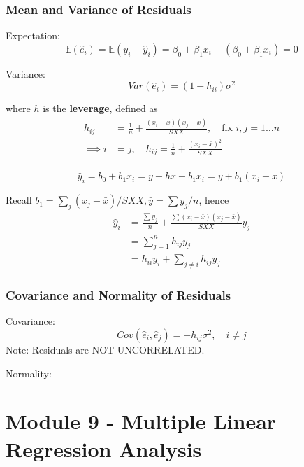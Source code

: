 \documentclass[11pt]{article}
\theoremstyle{definition}
\numberwithin{equation}{section}
\begin{document}
\subsubsection{Mean and Variance of Residuals}

Expectation:
\begin{equation}
  \mathbb{E}(\hat{e}_i)=\mathbb{E}(y_i - \hat{y}_i) = \beta_0+\beta_1x_i-(\beta_0+\beta_1x_i)=0
\end{equation}

Variance:
\begin{equation}
  Var(\hat{e}_i) = (1-h_{ii})\sigma^2
\end{equation}

where $h$ is the \textbf{leverage}, defined as 
\begin{align}
  h_{ij} &= \frac{1}{n} + \frac{(x_i-\bar{x})(x_j-\bar{x})}{SXX},\quad\text{fix }i,j=1\dots n\\
  \implies i&=j,\quad h_{ij} =\frac{1}{n}+\frac{(x_i-\bar{x})^2}{SXX}\\
\end{align}

\begin{equation}
  \hat{y}_i=b_0+b_1x_i=\bar{y}-h\bar{x}+b_1x_i=\bar{y}+b_1(x_i-\bar{x})
\end{equation}

Recall $b_1=\sum_j(x_j-\bar{x})/SXX,\bar{y}=\sum y_j/n$, hence
\begin{align}
  \hat{y}_i&=\frac{\sum y_j}{n} + \frac{\sum(x_i-\bar{x})(x_j-\bar{x})}{SXX}y_j\\
  &= \sum^n_{j=1}h_{ij}y_j\\
  &= h_{ii}y_i+\sum_{j\neq i}h_{ij}y_j
\end{align}

\subsubsection{Covariance and Normality of Residuals}
Covariance:
\begin{equation}
  Cov(\hat{e}_i,\hat{e}_j)=-h_{ij}\sigma^2,\quad i\neq j
\end{equation}
Note: Residuals are NOT UNCORRELATED.

Normality:

\newpage
\section{Module 9 - Multiple Linear Regression Analysis}
\end{document}
